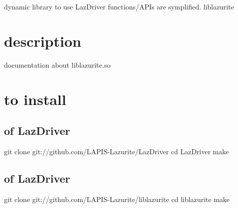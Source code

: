 dynamic library to use Laz\+Driver functions/\+A\+P\+Is are symplified. liblazurite \hypertarget{index_general}{}\section{description}\label{index_general}
documentation about liblazurite.\+so\hypertarget{index_how}{}\section{to install}\label{index_how}
\hypertarget{index_install}{}\subsection{of Laz\+Driver}\label{index_install}

\begin{DoxyCode}
git clone git:\textcolor{comment}{//github.com/LAPIS-Lazurite/LazDriver}
cd LazDriver
make
\end{DoxyCode}
\hypertarget{index_install}{}\subsection{of Laz\+Driver}\label{index_install}

\begin{DoxyCode}
git clone git:\textcolor{comment}{//github.com/LAPIS-Lazurite/liblazurite}
cd liblazurite
make
\end{DoxyCode}


